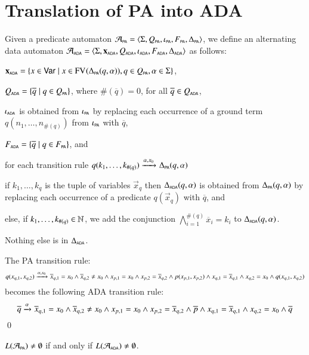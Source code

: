 \documentclass{llncs}
\begin{document}
\section{Translation of PA into ADA}

Given a predicate automaton $\A_\PA = \tuple{\Sigma, Q_\PA, \iota_\PA,
  F_\PA, \Delta_\PA}$, we define an alternating data automaton
$\A_\ADA = \tuple{\Sigma, \vec{x}_\ADA, Q_\ADA, \iota_\ADA, F_\ADA,
  \Delta_\ADA}$ as follows: \begin{compactitem}
\item $\vec{x}_\ADA = \set{x \in \vars \mid x \in \fv{}{\Delta_\PA(q,\alpha)}, q \in Q_\PA, \alpha \in \Sigma}$, 
%
\item $Q_\ADA = \set{\overline{q} \mid q \in Q_\PA}$, where $\#(\overline{q}) = 0$, for all $\overline{q} \in Q_\ADA$,
%
\item $\iota_\ADA$ is obtained from $\iota_\PA$ by replacing each
  occurrence of a ground term $q(n_1,\ldots,n_{\#(q)})$ from
  $\iota_\PA$ with $\overline{q}$,
%
\item $F_\ADA = \set{\overline{q} \mid q \in F_\PA}$, and 
%
\item for each transition rule \(q(k_1,\ldots,k_{\#(q)}) \arrow{\alpha,x_0}{}
  \Delta_\PA(q,\alpha)\) \begin{compactitem}
  \item if \(k_1,\ldots,k_q\) is the tuple of variables $\vec{x}_q$
    then \(\Delta_\ADA(q,\alpha)\) is obtained from
    \(\Delta_\PA(q,\alpha)\) by replacing each occurrence of a
    predicate $q(\vec{x}_q)$ with $\overline{q}$, and
\item else, if \(k_1,\ldots,k_{\#(q)} \in \nat\), we add the
  conjunction $\bigwedge_{i=1}^{\#(q)} \overline{x}_i = k_i$ to
  \(\Delta_\ADA(q,\alpha)\).
  \end{compactitem}
  Nothing else is in $\Delta_\ADA$. 
\end{compactitem}

\begin{example}
The PA transition rule: 
\[q(x_{q,1},x_{q,2})
\arrow{\alpha,x_0}{} \overline{x}_{q,1} = x_0 \wedge
\overline{x}_{q,2} \neq x_0 \wedge x_{p,1} = x_0 \wedge x_{p,2} =
\overline{x}_{q,2} \wedge p(x_{p,1},x_{p,2}) \wedge x_{q,1} =
\overline{x}_{q,1} \wedge x_{q,2} = x_0 \wedge q(x_{q,1},x_{q,2})\]
becomes the following ADA transition rule:
\[\overline{q} \arrow{\alpha}{} \overline{x}_{q,1} = x_0 \wedge
\overline{x}_{q,2} \neq x_0 \wedge x_{p,1} = x_0 \wedge x_{p,2} =
\overline{x}_{q,2} \wedge \overline{p} \wedge x_{q,1} =
\overline{x}_{q,1} \wedge x_{q,2} = x_0 \wedge \overline{q}\]
\hfill\qed
\end{example}

\begin{claim}
  $L(\A_\PA) \neq \emptyset$ if and only if $L(\A_\ADA) \neq \emptyset$.
\end{claim}

\end{document}
